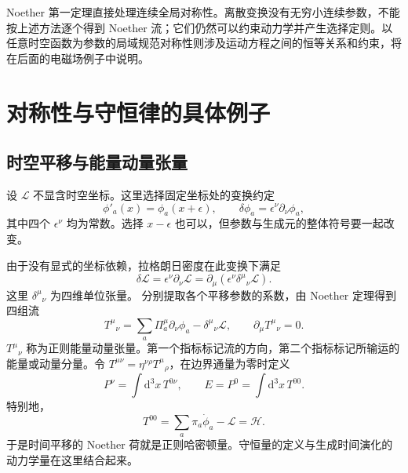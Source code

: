 Noether 第一定理直接处理连续全局对称性。离散变换没有无穷小连续参数，不能按上述方法逐个得到 Noether 流；它们仍然可以约束动力学并产生选择定则。以任意时空函数为参数的局域规范对称性则涉及运动方程之间的恒等关系和约束，将在后面的电磁场例子中说明。

\section{对称性与守恒律的具体例子}
\label{sec:prelude-examples}

\subsection{时空平移与能量动量张量}

设 $\mathcal{L}$ 不显含时空坐标。这里选择固定坐标处的变换约定
\begin{equation}
  \phi'_{a}(x)=\phi_{a}(x+\epsilon),\qquad
  \delta\phi_{a}=\epsilon^{\nu}\partial_{\nu}\phi_{a},
\end{equation}
其中四个 $\epsilon^{\nu}$ 均为常数。选择 $x-\epsilon$ 也可以，但参数与生成元的整体符号要一起改变。

由于没有显式的坐标依赖，拉格朗日密度在此变换下满足
\begin{equation}
  \delta\mathcal{L}=\epsilon^{\nu}\partial_{\nu}\mathcal{L}
  =\partial_{\mu}(\epsilon^{\nu}\delta^{\mu}{}_{\nu}\mathcal{L}).
\end{equation}
这里 $\delta^{\mu}{}_{\nu}$ 为四维单位张量。
分别提取各个平移参数的系数，由 Noether 定理得到四组流
\begin{equation}
  \boxed{T^{\mu}{}_{\nu}
  =\sum_{a}\Pi_{a}^{\mu}\partial_{\nu}\phi_{a}
  -\delta^{\mu}{}_{\nu}\mathcal{L},\qquad
  \partial_{\mu}T^{\mu}{}_{\nu}=0.}
  \label{eq:prelude-canonical-tensor}
\end{equation}
$T^{\mu}{}_{\nu}$ 称为正则能量动量张量。第一个指标标记流的方向，第二个指标标记所输运的能量或动量分量。令
$T^{\mu\nu}=\eta^{\nu\rho}T^{\mu}{}_{\rho}$，在边界通量为零时定义
\begin{equation}
  P^{\nu}=\int\mathrm{d}^{3}x\,T^{0\nu},\qquad
  E=P^{0}=\int\mathrm{d}^{3}x\,T^{00}.
\end{equation}
特别地，
\begin{equation}
  T^{00}=\sum_{a}\pi_{a}\dot\phi_{a}-\mathcal{L}=\mathcal{H}.
\end{equation}
于是时间平移的 Noether 荷就是正则哈密顿量。守恒量的定义与生成时间演化的动力学量在这里结合起来。

